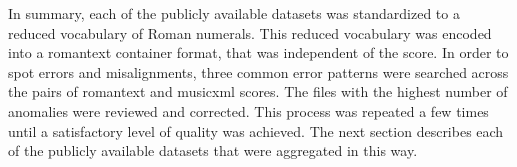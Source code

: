 
In summary, each of the publicly available datasets was
standardized to a reduced vocabulary of Roman numerals. This
reduced vocabulary was encoded into a \gls{romantext}
container format, that was independent of the score. In
order to spot errors and misalignments, three common error
patterns were searched across the pairs of \gls{romantext}
and \gls{musicxml} scores. The files with the highest number
of anomalies were reviewed and corrected. This process was
repeated a few times until a satisfactory level of quality
was achieved. The next section describes each of the
publicly available datasets that were aggregated in this
way.

